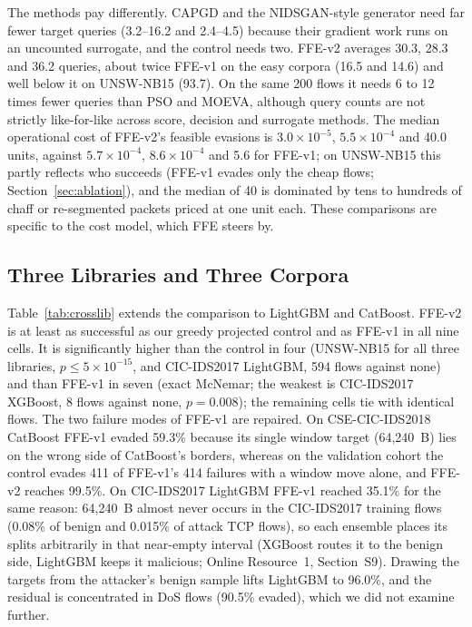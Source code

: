 The methods pay differently. CAPGD and the NIDSGAN-style generator need far fewer target queries (3.2--16.2 and 2.4--4.5) because their gradient work runs on an uncounted surrogate, and the control needs two. FFE-v2 averages 30.3, 28.3 and 36.2 queries, about twice FFE-v1 on the easy corpora (16.5 and 14.6) and well below it on UNSW-NB15 (93.7). On the same 200 flows it needs 6 to 12 times fewer queries than PSO and MOEVA, although query counts are not strictly like-for-like across score, decision and surrogate methods. The median operational cost of FFE-v2's feasible evasions is $3.0\times10^{-5}$, $5.5\times10^{-4}$ and 40.0 units, against $5.7\times10^{-4}$, $8.6\times10^{-4}$ and 5.6 for FFE-v1; on UNSW-NB15 this partly reflects who succeeds (FFE-v1 evades only the cheap flows; Section~\ref{sec:ablation}), and the median of 40 is dominated by tens to hundreds of chaff or re-segmented packets priced at one unit each. These comparisons are specific to the cost model, which FFE steers by.

\subsection{Three Libraries and Three Corpora}
\label{sec:multidataset_results}

\begin{table}[!htbp]
\centering
\caption{Real ASR (\%) on the 1,000-flow test cohorts (CatBoost: flows it detects), with clean test accuracy and mean queries per flow ($q$). Single frozen evaluation.}\label{tab:crosslib}
\resizebox{\textwidth}{!}{\begin{varwidth}{\maxdimen}\noindent%
%
\end{varwidth}}
\end{table}

Table~\ref{tab:crosslib} extends the comparison to LightGBM and CatBoost. FFE-v2 is at least as successful as our greedy projected control and as FFE-v1 in all nine cells. It is significantly higher than the control in four (UNSW-NB15 for all three libraries, $p\le5\times10^{-15}$, and CIC-IDS2017 LightGBM, 594 flows against none) and than FFE-v1 in seven (exact McNemar; the weakest is CIC-IDS2017 XGBoost, 8 flows against none, $p=0.008$); the remaining cells tie with identical flows. The two failure modes of FFE-v1 are repaired. On CSE-CIC-IDS2018 CatBoost FFE-v1 evaded 59.3\% because its single window target (64,240~B) lies on the wrong side of CatBoost's borders, whereas on the validation cohort the control evades 411 of FFE-v1's 414 failures with a window move alone, and FFE-v2 reaches 99.5\%. On CIC-IDS2017 LightGBM FFE-v1 reached 35.1\% for the same reason: 64,240~B almost never occurs in the CIC-IDS2017 training flows (0.08\% of benign and 0.015\% of attack TCP flows), so each ensemble places its splits arbitrarily in that near-empty interval (XGBoost routes it to the benign side, LightGBM keeps it malicious; Online Resource~1, Section~S9). Drawing the targets from the attacker's benign sample lifts LightGBM to 96.0\%, and the residual is concentrated in DoS flows (90.5\% evaded), which we did not examine further.

